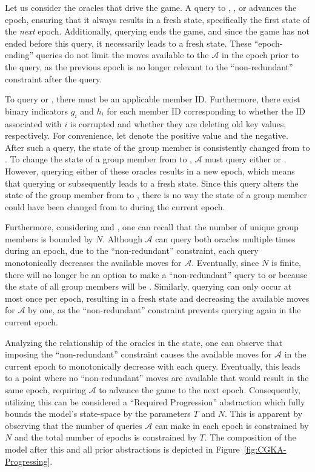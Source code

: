 \documentclass[authordraft,sigconf]{acmart}
\newcommand{\Adversary}{\ensuremath{\mathcal{A}}\xspace}
\begin{document}
Let us consider the oracles that drive the game. A query to , , or  advances the epoch, ensuring that it always results in a fresh state, specifically the first state of the \emph{next} epoch.
Additionally, querying  ends the game, and since the game has not ended before this query, it necessarily leads to a fresh state.
These ``epoch-ending'' queries do not limit the moves available to the \Adversary in the epoch prior to the query, as the previous epoch is no longer relevant to the ``non-redundant'' constraint after the query.

To query  or , there must be an applicable member ID.
Furthermore, there exist binary indicators $g_{i}$ and $h_{i}$ for each member ID corresponding to whether the ID associated with $i$ is corrupted and whether they are deleting old key values, respectively.
For convenience, let \True denote the positive value and \False the negative.
After such a query, the state of the group member is consistently changed from \True to \False.
To change the state of a group member from \False to \True, \Adversary must query either  or .
However, querying either of these oracles results in a new epoch, which means that querying  or  subsequently leads to a fresh state.
Since this query alters the state of the group member from \True to \False, there is no way the state of a group member could have been changed from \False to \True during the current epoch.

Furthermore, considering  and , one can recall that the number of unique group members is bounded by $N$.
Although \Adversary can query both oracles multiple times during an epoch, due to the ``non-redundant'' constraint, each query monotonically decreases the available moves for \Adversary.
Eventually, since $N$ is finite, there will no longer be an option to make a ``non-redundant'' query to  or  because the state of all group members will be \False.
Similarly, querying  can only occur at most once per epoch, resulting in a fresh state and decreasing the available moves for \Adversary by one, as the ``non-redundant'' constraint prevents querying  again in the current epoch.

Analyzing the relationship of the oracles in the \CGKAsec state, one can observe that imposing the ``non-redundant'' constraint causes the available moves for \Adversary in the current epoch to monotonically decrease with each query.
Eventually, this leads to a point where no ``non-redundant'' moves are available that would result in the same epoch, requiring \Adversary to advance the game to the next epoch.
Consequently, utilizing this can be considered a ``Required Progression''  abstraction which fully bounds the model's state-space by the parameters $T$ and $N$.
This is apparent by observing that the number of queries \Adversary can make in each epoch is constrained by $N$ and the total number of epochs is constrained by $T$.
The composition of the model after this and all prior abstractions is depicted in Figure~\ref{fig:CGKA-Progressing}.
\end{document}
